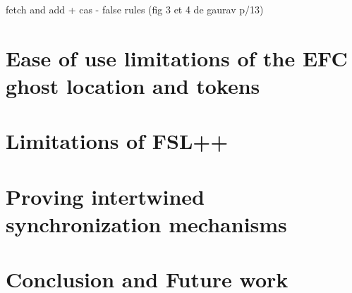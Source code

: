 \documentclass[titlepage,11pt,a4paper]{report}
\theoremstyle{plain}
\begin{document}
fetch and add  + cas - false rules (fig 3 et 4 de gaurav p/13)

\chapter{Ease of use limitations of the EFC ghost location and tokens}



\chapter{Limitations of FSL++}


\chapter{Proving intertwined synchronization mechanisms}




\chapter{Conclusion and Future work}

\section{}
%
\cleardoublepage
{}
{}



\appendix



\end{document}
